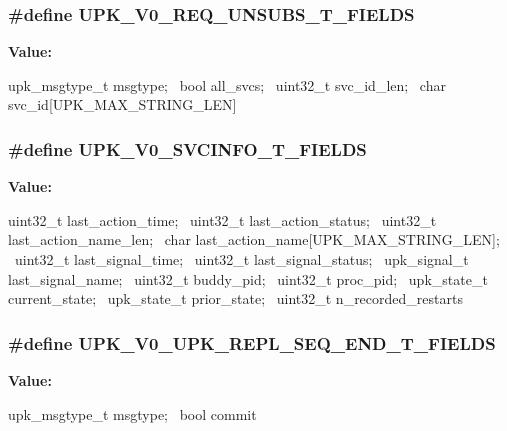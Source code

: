 \subsubsection[{UPK\_\-V0\_\-REQ\_\-UNSUBS\_\-T\_\-FIELDS}]{\setlength{\rightskip}{0pt plus 5cm}\#define UPK\_\-V0\_\-REQ\_\-UNSUBS\_\-T\_\-FIELDS}\label{upk__v0__protocol__structs_8h_a2b6288d2c66ef74a6650ef44cc044189}
{\bfseries Value:}
\begin{DoxyCode}
upk_msgtype_t       msgtype; \
    bool                all_svcs; \
    uint32_t            svc_id_len; \
    char                svc_id[UPK_MAX_STRING_LEN]
\end{DoxyCode}
\subsubsection[{UPK\_\-V0\_\-SVCINFO\_\-T\_\-FIELDS}]{\setlength{\rightskip}{0pt plus 5cm}\#define UPK\_\-V0\_\-SVCINFO\_\-T\_\-FIELDS}\label{upk__v0__protocol__structs_8h_acccca258049c0a041c3e20291266bc79}
{\bfseries Value:}
\begin{DoxyCode}
uint32_t                last_action_time; \
    uint32_t                last_action_status; \
    uint32_t                last_action_name_len; \
    char                    last_action_name[UPK_MAX_STRING_LEN]; \
    uint32_t                last_signal_time; \
    uint32_t                last_signal_status; \
    upk_signal_t            last_signal_name; \
    uint32_t                buddy_pid; \
    uint32_t                proc_pid; \
    upk_state_t             current_state; \
    upk_state_t             prior_state; \
    uint32_t                n_recorded_restarts
\end{DoxyCode}
\subsubsection[{UPK\_\-V0\_\-UPK\_\-REPL\_\-SEQ\_\-END\_\-T\_\-FIELDS}]{\setlength{\rightskip}{0pt plus 5cm}\#define UPK\_\-V0\_\-UPK\_\-REPL\_\-SEQ\_\-END\_\-T\_\-FIELDS}\label{upk__v0__protocol__structs_8h_a3ed27dd7d93ecf5d795930425868cb19}
{\bfseries Value:}
\begin{DoxyCode}
upk_msgtype_t      msgtype; \
    bool                    commit
\end{DoxyCode}

